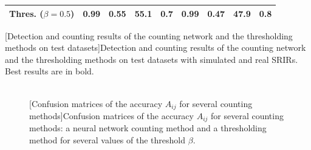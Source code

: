 \begin{table}[t]
\begin{adjustbox}{width=1.1\textwidth,center}
\begin{tabular}{|c|cccc|cccc|}
        \textbf{Thres. ($\beta = 0.5$)}           & \textbf{0.99}                      & 0.55                              & 55.1                                   & 0.7                                           & \textbf{0.99}                      & 0.47                              & 47.9                                   & 0.8                                           \\ \hline
    \end{tabular}
    \end{adjustbox}
    [Detection and counting results of the counting network and the thresholding methods on test datasets]{Detection and counting results of the counting network and the thresholding methods on test datasets with simulated and real SRIRs. Best results are in bold.}
    \label{tab:hybrid_nosInjectionCountingResults}
\end{table}

\begin{figure}[t]
    \centering
    \\
    [Confusion matrices of the accuracy $A_{ij}$ for several counting methods]{Confusion matrices of the accuracy $A_{ij}$ for several counting methods: a neural network counting method and a thresholding method for several values of the threshold $\beta$.}
    \label{fig:hybrid_nosPrediction_confusionMatrices}
\end{figure}

